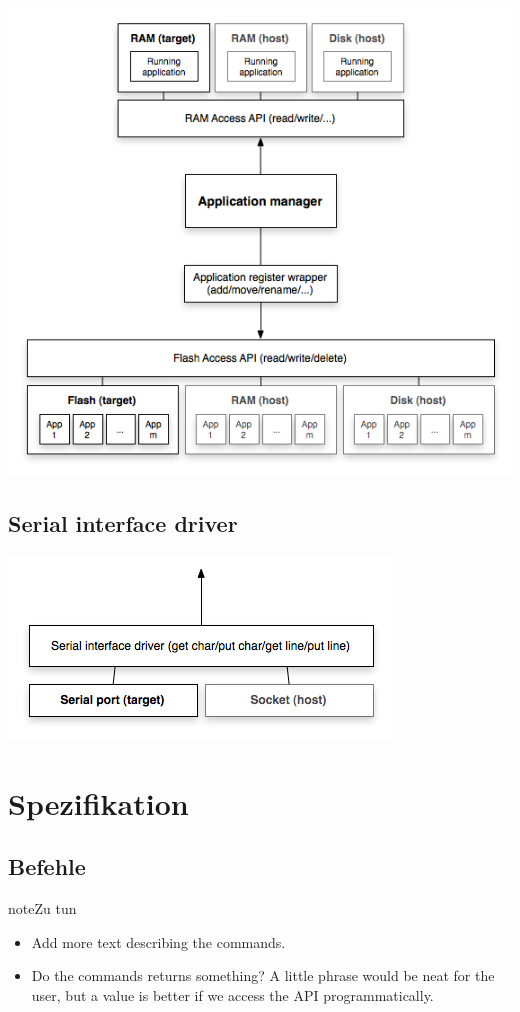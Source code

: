 \documentclass[letterpaper,10pt,ngerman]{manual}
\begin{document}
\includegraphics{app-manager.png}


\section{Serial interface driver}

\includegraphics{serial-driver.png}

\resetcurrentobjects
\hypertarget{--doc-specification/index}{}

\chapter{Spezifikation}

\resetcurrentobjects
\hypertarget{--doc-specification/commands}{}

\section{Befehle}
\hypertarget{todo-1}{}
\begin{notice}{note}{Zu tun}
\begin{itemize}
\item {} 
Add more text describing the commands.

\item {} 
Do the commands returns something? A little phrase would be neat for the
user, but a value is better if we access the API programmatically.

\end{itemize}
\end{notice}
\end{document}
